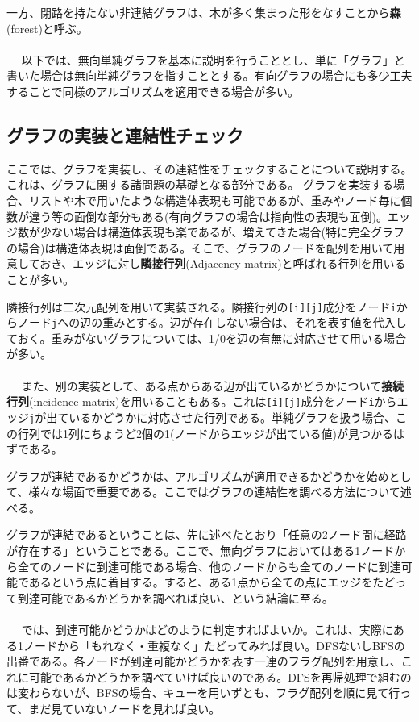 一方、閉路を持たない非連結グラフは、木が多く集まった形をなすことから\textbf{森}(forest)と呼ぶ。
\\ \\　
以下では、無向単純グラフを基本に説明を行うこととし、単に「グラフ」と書いた場合は無向単純グラフを指すこととする。有向グラフの場合にも多少工夫することで同様のアルゴリズムを適用できる場合が多い。

\subsection{グラフの実装と連結性チェック}
ここでは、グラフを実装し、その連結性をチェックすることについて説明する。これは、グラフに関する諸問題の基礎となる部分である。
グラフを実装する場合、リストや木で用いたような構造体表現も可能であるが、重みやノード毎に個数が違う等の面倒な部分もある(有向グラフの場合は指向性の表現も面倒)。エッジ数が少ない場合は構造体表現も楽であるが、増えてきた場合(特に完全グラフの場合)は構造体表現は面倒である。そこで、グラフのノードを配列を用いて用意しておき、エッジに対し\textbf{隣接行列}(Adjacency matrix)と呼ばれる行列を用いることが多い。

隣接行列は二次元配列を用いて実装される。隣接行列の\verb|[i][j]|成分をノード\verb|i|からノード\verb|j|への辺の重みとする。辺が存在しない場合は、それを表す値を代入しておく。重みがないグラフについては、1/0を辺の有無に対応させて用いる場合が多い。
\\ \\　
また、別の実装として、ある点からある辺が出ているかどうかについて\textbf{接続行列}(incidence matrix)を用いることもある。これは\verb|[i][j]|成分をノード\verb|i|からエッジ\verb|j|が出ているかどうかに対応させた行列である。単純グラフを扱う場合、この行列では1列にちょうど2個の1(ノードからエッジが出ている値)が見つかるはずである。

グラフが連結であるかどうかは、アルゴリズムが適用できるかどうかを始めとして、様々な場面で重要である。ここではグラフの連結性を調べる方法について述べる。

グラフが連結であるということは、先に述べたとおり「任意の2ノード間に経路が存在する」ということである。ここで、無向グラフにおいてはある1ノードから全てのノードに到達可能である場合、他のノードからも全てのノードに到達可能であるという点に着目する。すると、ある1点から全ての点にエッジをたどって到達可能であるかどうかを調べれば良い、という結論に至る。
\\ \\　
では、到達可能かどうかはどのように判定すればよいか。これは、実際にある1ノードから「もれなく・重複なく」たどってみれば良い。DFSないしBFSの出番である。各ノードが到達可能かどうかを表す一連のフラグ配列を用意し、これに可能であるかどうかを調べていけば良いのである。DFSを再帰処理で組むのは変わらないが、BFSの場合、キューを用いずとも、フラグ配列を順に見て行って、まだ見ていないノードを見れば良い。

